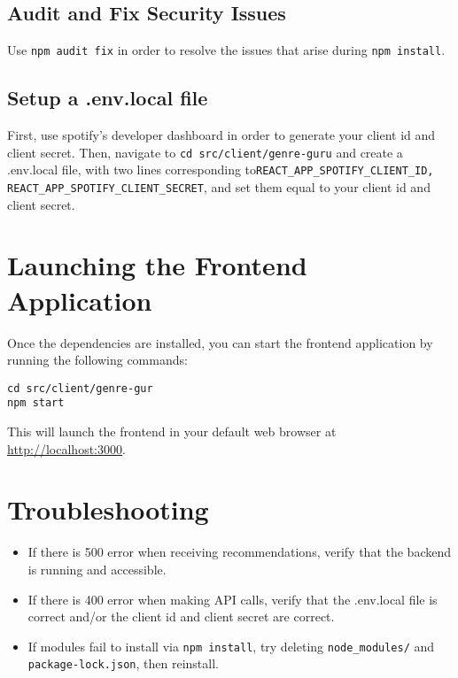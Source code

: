 \documentclass{article}
\begin{document}
\subsection{Audit and Fix Security Issues}
Use \texttt{npm audit fix} in order to resolve the issues that arise during \texttt{npm install}. 

\subsection{Setup a .env.local file}
First, use spotify's developer dashboard in order to generate your client id and client secret.
Then, navigate to \texttt{cd src/client/genre-guru} and create a .env.local file, with two lines corresponding to\texttt{REACT\_APP\_SPOTIFY\_CLIENT\_ID, REACT\_APP\_SPOTIFY\_CLIENT\_SECRET},
and set them equal to your client id and client secret.

\section{Launching the Frontend Application}
Once the dependencies are installed, you can start the frontend application by running the following commands:

\begin{verbatim}
cd src/client/genre-gur
npm start
\end{verbatim}

This will launch the frontend in your default web browser at \url{http://localhost:3000}.

\section{Troubleshooting}
\begin{itemize}
  \item If there is 500 error when receiving recommendations, verify that the backend is running and accessible.
  \item If there is 400 error when making API calls, verify that the .env.local file is correct and/or the client id and client secret are correct.
  \item If modules fail to install via \texttt{npm install}, try deleting \texttt{node\_modules/} and \texttt{package-lock.json}, then reinstall.
\end{itemize}
\end{document}
